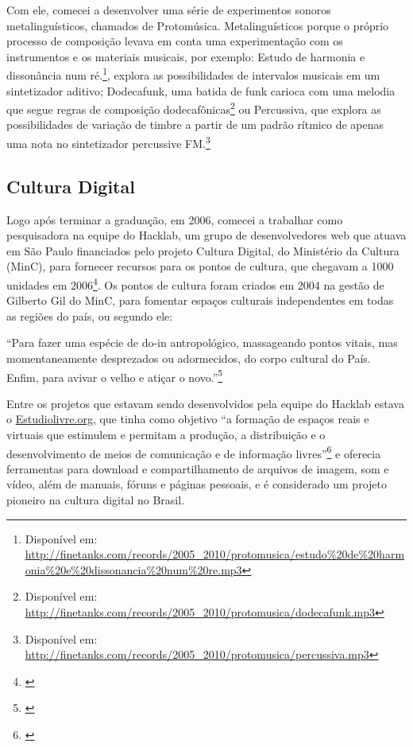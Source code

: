 Com ele, comecei a desenvolver uma série de experimentos sonoros metalinguísticos, chamados de Protomúsica. Metalinguísticos porque o próprio processo de composição levava em conta uma experimentação com os instrumentos e os materiais musicais, por exemplo:
Estudo de harmonia e dissonância num ré.\footnote{Disponível em: \url{http://finetanks.com/records/2005_2010/protomusica/estudo\%20de\%20harmonia\%20e\%20dissonancia\%20num\%20re.mp3}}, explora as possibilidades de intervalos musicais em um sintetizador aditivo;
Dodecafunk, uma batida de funk carioca com uma melodia que segue regras de composição dodecafônicas\footnote{Disponível em: \url{http://finetanks.com/records/2005_2010/protomusica/dodecafunk.mp3}} ou
Percussiva, que explora as possibilidades de variação de timbre a partir de um padrão rítmico de apenas uma nota no sintetizador percussive FM.\footnote{Disponível em: \url{http://finetanks.com/records/2005_2010/protomusica/percussiva.mp3}}






\subsection{Cultura Digital}

Logo após terminar a graduação, em 2006, comecei a trabalhar como pesquisadora na equipe do Hacklab, um grupo de desenvolvedores web que atuava em São Paulo financiados pelo projeto Cultura Digital, do Ministério da Cultura (MinC), para fornecer recursos para os pontos de cultura, que chegavam a 1000 unidades em 2006\footnote{\cite[6]{Lima2009}}. Os pontos de cultura foram criados em 2004 na gestão de Gilberto Gil do MinC, para fomentar espaços culturais independentes em todas as regiões do país, ou segundo ele:
\begin{citacao}

``Para fazer uma espécie de do-in antropológico, massageando pontos vitais, mas momentaneamente desprezados ou adormecidos, do corpo cultural do País. Enfim, para avivar o velho e atiçar o novo.''\footnote{\cite{GilbertoGil2003}} 
\end{citacao}

Entre os projetos que estavam sendo desenvolvidos pela equipe do Hacklab estava o \url{Estudiolivre.org}, que tinha como objetivo ``a formação de espaços reais e virtuais que estimulem e permitam a produção, a distribuição e o desenvolvimento de meios de comunicação e de informação livres''\footnote{\cite[12]{Lima2009}} e oferecia ferramentas para download e compartilhamento de arquivos de imagem, som e vídeo, além de manuais, fóruns e páginas pessoais, e é considerado um projeto pioneiro na cultura digital no Brasil.  


